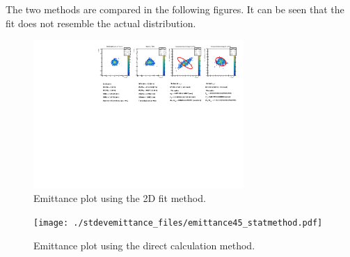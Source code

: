 \documentclass{article}
\begin{document}
The two methods are compared in the following figures. It can be seen that the fit does not resemble the actual distribution.

\begin{figure}[H]
  \begin{center}
    \includegraphics[clip,width=8.0cm,angle=-90]{./stdevemittance_files/emittance45_fitmethod.pdf}
    \caption{Emittance plot using the 2D fit method.\label{fig:emittancefit}}
  \end{center}
\end{figure}

\begin{figure}[H]
  \begin{center}
    \texttt{[image: ./stdevemittance\_files/emittance45\_statmethod.pdf]}
    \caption{Emittance plot using the direct calculation method.\label{fig:emittancestat}}
  \end{center}
\end{figure}
\end{document}
